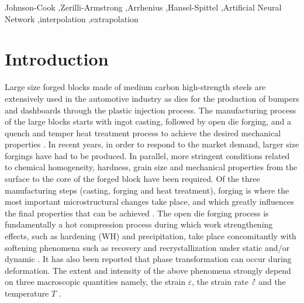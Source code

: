 \documentclass[twoside,english,1p,final,sort&compress]{elsarticle}
\theoremstyle{plain}
\DeclareRobustCommand{\mdot}[1]{\accentset{\mbox{\bfseries .}}{#1}}
\begin{document}
\begin{frontmatter}
\begin{keyword}
Johnson-Cook \sep Zerilli-Armstrong \sep Arrhenius \sep Hansel-Spittel \sep Artificial Neural Network  \sep interpolation  \sep extrapolation 
\end{keyword}

\end{frontmatter}
\linenumbers

\section{Introduction\label{sec:Introduction}}
Large size forged blocks made of medium carbon high-strength steels are extensively used in the automotive industry as dies for the production of bumpers and dashboards through the plastic injection process. The manufacturing process of the large blocks starts with ingot casting, followed by open die forging, and a quench and temper heat treatment process to achieve the desired mechanical properties  \cite{chadha2017deformation,chadha2018influence,murugesan2019two}. In recent years, in order to respond to the market demand, larger size forgings have had to be produced. In parallel, more stringent conditions related to chemical homogeneity, hardness, grain size and mechanical properties from the surface to the core of the forged block have been required. Of the three manufacturing steps (casting, forging and heat treatment), forging is where the most important microstructural changes take place, and which greatly influences the final properties that can be achieved \cite{murugesan2019hybrid,chadha2020microstructure,sripada2022effect}. The open die forging process is fundamentally a hot compression process during which work strengthening effects, such as hardening (WH) and precipitation,  take place concomitantly with softening phenomena such as   recovery and recrystallization under static and/or dynamic \cite{tian2022deformation,tavakoli2019ferrite}. It has also been reported that phase transformation can occur during deformation. The extent and intensity of the above phenomena strongly depend on three macroscopic quantities namely, the strain $\varepsilon$, the strain rate $\mdot\varepsilon$ and the temperature $T$  \cite{ ebrahimi2017flow,Ashtiani-2012,He-2013, Changizian-2012}. 
 
\end{document}

